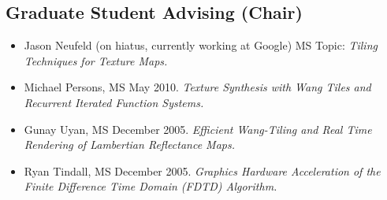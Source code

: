 \documentclass[10pt]{article}
\begin{document}
\subsection*{Graduate Student Advising (Chair)}
\begin{itemize}
\item Jason Neufeld (on hiatus, currently working at Google) MS Topic: {\em Tiling Techniques for Texture Maps.}
\item Michael Persons, MS May 2010.
  {\em Texture Synthesis with Wang Tiles and Recurrent Iterated Function Systems.}
\item Gunay Uyan, MS December 2005. {\em Efficient Wang-Tiling and Real Time
   Rendering of Lambertian Reflectance Maps.}
\item Ryan Tindall, MS December 2005. {\em Graphics Hardware Acceleration
   of the Finite Difference Time Domain (FDTD) Algorithm.}
\end{itemize}
\end{document}
